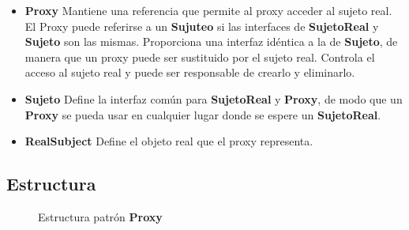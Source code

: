 \begin{itemize}
\item \textbf{Proxy} Mantiene una referencia que permite al proxy acceder al sujeto real. El Proxy puede referirse a un \textbf{Sujuteo} si las interfaces de \textbf{SujetoReal} y \textbf{Sujeto} son las mismas.
Proporciona una interfaz idéntica a la de \textbf{Sujeto}, de manera que un proxy puede ser sustituido por el sujeto real.
Controla el acceso al sujeto real y puede ser responsable de crearlo y eliminarlo.

\item \textbf{Sujeto} Define la interfaz común para \textbf{SujetoReal} y \textbf{Proxy}, de modo que un \textbf{Proxy} se pueda usar en cualquier lugar donde se espere un \textbf{SujetoReal}.

\item \textbf{RealSubject} Define el objeto real que el proxy representa.

\end{itemize}


\subsection*{Estructura}


\begin{figure}[h]
\caption{Estructura patrón \textbf{Proxy}}
\begin{center}
\end{center}
\end{figure}





